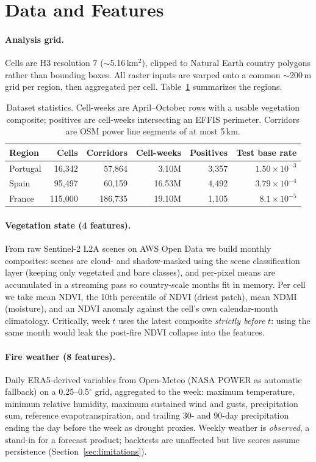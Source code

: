 \documentclass[11pt]{article}
\begin{document}
\section{Data and Features}
\label{sec:features}

\paragraph{Analysis grid.} Cells are H3 resolution 7 ($\sim$5.16\,km$^2$),
clipped to Natural Earth country polygons rather than bounding boxes. All
raster inputs are warped onto a common $\sim$200\,m grid per region, then
aggregated per cell. Table~\ref{tab:data} summarizes the regions.

\begin{table}[t]
\centering
\small
\caption{Dataset statistics. Cell-weeks are April--October rows with a usable
vegetation composite; positives are cell-weeks intersecting an EFFIS
perimeter. Corridors are OSM power line segments of at most 5\,km.}
\label{tab:data}
\begin{tabular}{lrrrrr}
\toprule
Region & Cells & Corridors & Cell-weeks & Positives & Test base rate \\
\midrule
Portugal & 16{,}342 & 57{,}864 & 3.10M & 3{,}357 & $1.50\times10^{-3}$ \\
Spain & 95{,}497 & 60{,}159 & 16.53M & 4{,}492 & $3.79\times10^{-4}$ \\
France & 115{,}000 & 186{,}735 & 19.10M & 1{,}105 & $8.1\times10^{-5}$ \\
\bottomrule
\end{tabular}
\end{table}

\paragraph{Vegetation state (4 features).} From raw Sentinel-2 L2A scenes on
AWS Open Data we build monthly composites: scenes are cloud- and
shadow-masked using the scene classification layer (keeping only vegetated
and bare classes), and per-pixel means are accumulated in a streaming pass so
country-scale months fit in memory. Per cell we take mean NDVI, the 10th
percentile of NDVI (driest patch), mean NDMI (moisture), and an NDVI anomaly
against the cell's own calendar-month climatology. Critically, week $t$ uses
the latest composite \emph{strictly before} $t$: using the same month would
leak the post-fire NDVI collapse into the features.

\paragraph{Fire weather (8 features).} Daily ERA5-derived variables from
Open-Meteo (NASA POWER as automatic fallback) on a 0.25--0.5$^\circ$ grid,
aggregated to the week: maximum temperature, minimum relative humidity,
maximum sustained wind and gusts, precipitation sum, reference
evapotranspiration, and trailing 30- and 90-day precipitation ending the day
before the week as drought proxies. Weekly weather is \emph{observed}, a
stand-in for a forecast product; backtests are unaffected but live scores
assume persistence (Section~\ref{sec:limitations}).
\end{document}

